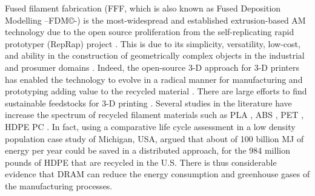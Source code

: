 \documentclass[
  12pt,
  number]{article}
\begin{document}
Fused filament fabrication (FFF, which is also known as Fused Deposition
Modelling --FDM©-) is the most-widespread and established
extrusion-based AM technology due to the open source proliferation from
the self-replicating rapid prototyper (RepRap) project
\citep{jones2011, sells2009, bowyer2014}. This is due to its simplicity,
versatility, low-cost, and ability in the construction of geometrically
complex objects in the industrial and prosumer domains
\citep{romani2022}. Indeed, the open-source 3-D approach for 3-D
printers has enabled the technology to evolve in a radical manner for
manufacturing and prototyping adding value to the recycled material
\citep{cruzsanchez2020}. There are large efforts to find sustainable
feedstocks for 3-D printing \citep[\citep{Pakkanen2017}]{rett2021}.
Several studies in the literature have increase the spectrum of recycled
filament materials such as PLA \citep{cruzsanchez2017, anderson2017},
ABS \citep{mohammed2017a, mohammed2017}, PET
\citep{zander2018, vaucher2022}, HDPE
\citep{chong2017, mohammed2017a, baechler2013} PC \citep{gaikwad2018}.
In fact, using a comparative life cycle assessment in a low density
population case study of Michigan, USA, \citep{Kreiger2014} argued that
about of 100 billion MJ of energy per year could be saved in a
distributed approach, for the 984 million pounds of HDPE that are
recycled in the U.S. There is thus considerable evidence that DRAM can
reduce the energy consumption and greenhouse gases of the manufacturing
processes.
\end{document}
